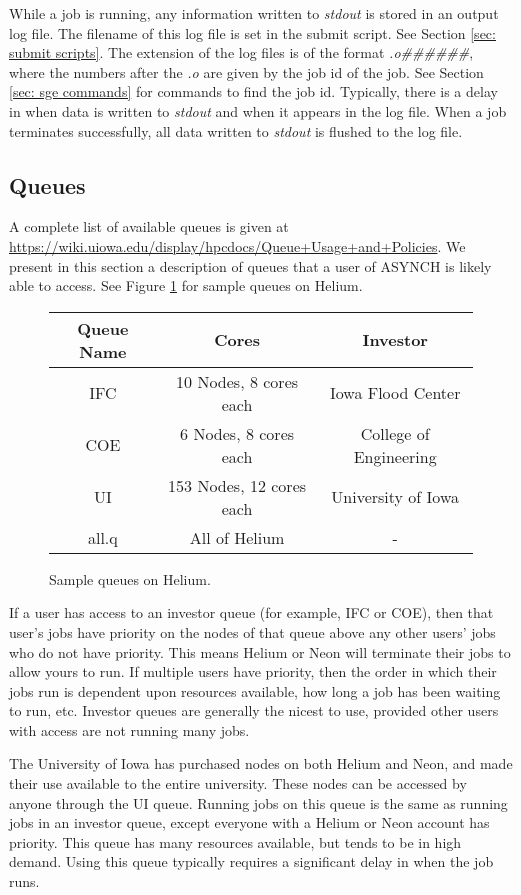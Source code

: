 \documentclass[12pt]{article}
\begin{document}
While a job is running, any information written to \emph{stdout} is stored in an output log file. The filename of this log file is set in the submit script. See Section \ref{sec: submit scripts}. The extension of the log files is of the format \emph{.o\#\#\#\#\#\#}, where the numbers after the \emph{.o} are given by the job id of the job. See Section \ref{sec: sge commands} for commands to find the job id. Typically, there is a delay in when data is written to \emph{stdout} and when it appears in the log file. When a job terminates successfully, all data written to \emph{stdout} is flushed to the log file.


\subsection{Queues} \label{sec: queues}

A complete list of available queues is given at \url{https://wiki.uiowa.edu/display/hpcdocs/Queue+Usage+and+Policies}. We present in this section a description of queues that a user of ASYNCH is likely able to access. See Figure \ref{fig: helium queues} for sample queues on Helium.

\begin{figure}
\centering
\begin{tabular}{|c|c|c|}
 \hline
 Queue Name & Cores & Investor \\
 \hline
 IFC & 10 Nodes, 8 cores each & Iowa Flood Center \\
 COE & 6 Nodes, 8 cores each & College of Engineering \\
 UI & 153 Nodes, 12 cores each & University of Iowa \\
 all.q & All of Helium & - \\
 \hline
 \end{tabular}
\caption{Sample queues on Helium.}
\label{fig: helium queues}
\end{figure}

If a user has access to an investor queue (for example, IFC or COE), then that user's jobs have priority on the nodes of that queue above any other users' jobs who do not have priority. This means Helium or Neon will terminate their jobs to allow yours to run. If multiple users have priority, then the order in which their jobs run is dependent upon resources available, how long a job has been waiting to run, etc. Investor queues are generally the nicest to use, provided other users with access are not running many jobs.

The University of Iowa has purchased nodes on both Helium and Neon, and made their use available to the entire university. These nodes can be accessed by anyone through the UI queue. Running jobs on this queue is the same as running jobs in an investor queue, except everyone with a Helium or Neon account has priority. This queue has many resources available, but tends to be in high demand. Using this queue typically requires a significant delay in when the job runs.
\end{document}
